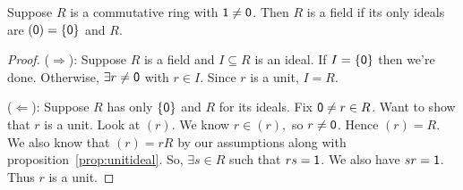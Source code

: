 \documentclass[notes.tex]{subfiles}
\begin{document}
\begin{corollary}
	Suppose $R$ is a commutative ring with $\mathsf{1}\ne\mathsf{0}$.
	Then $R$ is a field if its only ideals are $(\mathsf{0}) = \{\mathsf{0}\}$ and $R$.
\end{corollary}
\begin{proof}
	($\Longrightarrow$): Suppose $R$ is a field and $I\subseteq R$ is an ideal. If $I = \{\mathsf{0}\}$ then we're done. Otherwise, $\exists r\ne \mathsf{0}$ with $r\in I$. Since $r$ is a unit, $I = R$.

	($\Longleftarrow$): Suppose $R$ has only $\{\mathsf{0}\}$ and $R$ for its ideals. Fix $\mathsf{0}\ne r\in R$. Want to show that $r$ is a unit.
	Look at $(r)$. We know $r\in (r),$ so $r\ne \mathsf{0}$.  Hence $(r) = R$. We also know that $(r) = rR$ by our assumptions along with proposition~\ref{prop:unitideal}. So, $\exists s\in R$ such that $rs = \mathsf{1}$. We also have $sr = \mathsf{1}$. Thus $r$ is a unit.
\end{proof}
\end{document}
